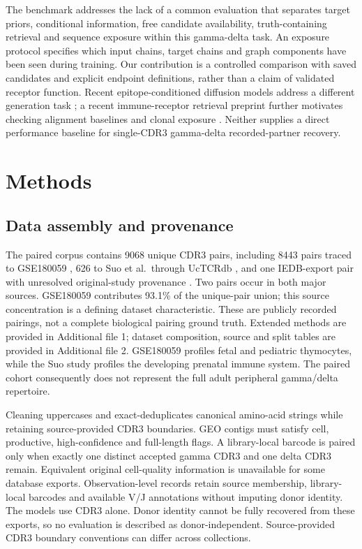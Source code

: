 \documentclass[12pt]{article}
\begin{document}
The benchmark addresses the lack of a common evaluation that separates target
priors, conditional information, free candidate availability, truth-containing
retrieval and sequence exposure within this gamma-delta task. An exposure
protocol specifies which input chains, target chains and graph components have
been seen during training. Our contribution is a controlled comparison with
saved candidates and explicit endpoint definitions, rather than a claim of
validated receptor function. Recent epitope-conditioned
diffusion models address a different generation task \cite{dtcr}; a recent
immune-receptor retrieval preprint further motivates checking alignment
baselines and clonal exposure \cite{germline_shortcut}. Neither supplies a direct
performance baseline for single-CDR3 gamma-delta recorded-partner recovery.

\section{Methods}
\subsection{Data assembly and provenance}
The paired corpus contains 9068 unique CDR3 pairs, including 8443 pairs traced
to GSE180059 \cite{gse180059}, 626 to Suo et al.\ through UcTCRdb
\cite{suo2022,uctcrdb}, and one IEDB-export pair with unresolved original-study
provenance \cite{iedb}. Two pairs occur in both major sources. GSE180059 contributes 93.1\% of the
unique-pair union; this source concentration is a defining dataset characteristic.
These are publicly recorded pairings, not a complete biological pairing ground truth.
Extended methods are provided in Additional file 1; dataset composition,
source and split tables are provided in Additional file 2. GSE180059 profiles
fetal and pediatric thymocytes, while the Suo study profiles the developing
prenatal immune system. The paired cohort consequently does not represent the
full adult peripheral gamma/delta repertoire.

Cleaning uppercases and exact-deduplicates canonical amino-acid strings while
retaining source-provided CDR3 boundaries. GEO contigs must satisfy cell,
productive, high-confidence and full-length flags. A library-local barcode is
paired only when exactly one distinct accepted gamma CDR3 and one delta CDR3
remain. Equivalent original cell-quality information is unavailable for some
database exports. Observation-level records retain source membership,
library-local barcodes and available V/J annotations without imputing donor
identity. The models use CDR3 alone. Donor identity cannot be fully recovered from these
exports, so no evaluation is described as donor-independent. Source-provided
CDR3 boundary conventions can differ across collections.
\end{document}

